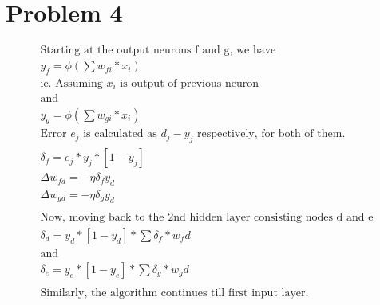 \documentclass[12pt]{article}
\begin{document}
\section*{Problem 4}
\begin{gather*}
    \text{Starting at the output neurons f and g, we have}\\
    y_f=\phi({\sum{w_{fi}*x_i}}) \\
    \text{ie. Assuming $x_i$ is output of previous neuron}\\
    \text{and}\\
    y_g=\phi({\sum{w_{gi}*x_i}})\\
    \text{Error $e_j$ is calculated as $d_j-y_j$ respectively, for both of them.}\\
    \delta_f = e_j*y_j*[1-y_j]\\
    \Delta w_{fd} = -\eta \delta_f y_d\\
    \Delta w_{gd} = -\eta \delta_g y_d\\
    \text{}\\
    \text{Now, moving back to the 2nd hidden layer consisting nodes d and e}\\
    \delta_d = y_d*[1-y_d]*\sum{\delta_f*w_fd}\\
    \text{and}\\
    \delta_e = y_e*[1-y_e]*\sum{\delta_g*w_gd}\\
    \\\text{Similarly, the algorithm continues till first input layer.}
\end{gather*}
\end{document}
